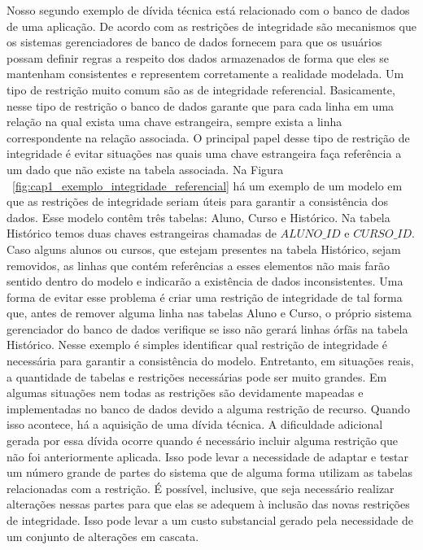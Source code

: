  
 Nosso segundo exemplo de dívida técnica está relacionado com o banco de dados de uma aplicação. De acordo com \cite{elmasri2016fundamentals} as restrições de integridade são mecanismos que os sistemas gerenciadores de banco de dados fornecem  para que os usuários possam definir regras a respeito dos dados armazenados de forma que eles se mantenham consistentes e representem corretamente a realidade modelada. Um tipo de restrição muito comum são as de integridade referencial. Basicamente, nesse tipo de restrição o banco de dados garante que para cada linha em uma relação na qual exista uma chave estrangeira, sempre exista a linha correspondente na relação associada. O principal papel desse tipo de restrição de integridade é evitar situações nas quais uma chave estrangeira faça referência a um dado que não existe na tabela associada. Na Figura ~\ref{fig:cap1_exemplo_integridade_referencial} há um exemplo de um modelo em que as restrições de integridade seriam úteis para garantir a consistência dos dados. Esse modelo contêm três tabelas: Aluno, Curso e Histórico. Na tabela Histórico temos duas chaves estrangeiras chamadas de $ALUNO\_ID$ e $CURSO\_ID$. Caso alguns alunos ou cursos, que estejam presentes na tabela Histórico, sejam removidos, as linhas que contém referências a esses elementos não mais farão sentido dentro do modelo e indicarão a existência de dados inconsistentes. Uma forma de evitar esse problema é criar uma restrição de integridade de tal forma que, antes de remover alguma linha nas tabelas Aluno e Curso, o próprio sistema gerenciador do banco de dados verifique se isso não gerará linhas órfãs na tabela Histórico. Nesse exemplo é simples identificar qual restrição de integridade é necessária para garantir a consistência do modelo. Entretanto, em situações reais, a quantidade de tabelas e restrições necessárias pode ser muito grandes. Em algumas situações nem todas as restrições são devidamente mapeadas e implementadas no banco de dados devido a alguma restrição de recurso. Quando isso acontece, há a aquisição de uma dívida técnica. A dificuldade adicional gerada por essa dívida ocorre quando é necessário incluir alguma restrição que não foi anteriormente aplicada. Isso pode levar a necessidade de adaptar e testar um número grande de partes do sistema que de alguma forma utilizam as tabelas relacionadas com a restrição. É possível, inclusive, que seja necessário realizar alterações nessas partes para que elas se adequem à inclusão das novas restrições de integridade. Isso pode levar a um custo substancial gerado pela necessidade de um conjunto de alterações em cascata. 
 
